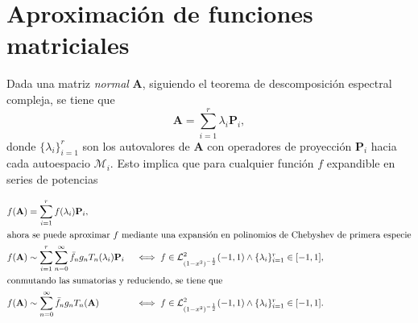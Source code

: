 \section[Aproximación de funciones matriciales]{Aproximación de funciones matriciales}
Dada una matriz \emph{normal} $\mathbf A$, siguiendo el teorema de descomposición espectral compleja, se tiene que 
\begin{equation*}\mathbf A = \sum_{i=1}^r \lambda_i \mathbf P_i, \end{equation*}
donde $\{\lambda_i\}_{i=1}^r$ son los autovalores de $\mathbf A$ con operadores de proyección $\mathbf P_i$ hacia cada autoespacio $\mathcal M_i$. Esto implica que para cualquier función $f$ expandible en series de potencias

\begin{align*} 
	f(\mathbf A) &= \sum_{i=1}^r f(\lambda_i) \mathbf P_i,\\
	\intertext{ahora se puede aproximar $f$ mediante una expansión en polinomios de Chebyshev de primera especie}
	f(\mathbf A) &\sim \sum_{i=1}^r \sum_{n=0}^\infty \bar{f}_n g_n T_n(\lambda_i) \mathbf P_i
	&&\iff f \in \mathcal{L}^2_{(1-x^2)^{-\frac12}} (-1, 1) \land \{\lambda_i\}_{i=1}^r \in [-1, 1],\\
	\intertext{conmutando las sumatorias y reduciendo, se tiene que}
	f(\mathbf A) &\sim \sum_{n=0}^\infty \bar{f}_n g_n T_n(\mathbf A) 
	&&\iff f \in \mathcal{L}^2_{(1-x^2)^{-\frac12}} (-1, 1) \land \{\lambda_i\}_{i=1}^r \in [-1, 1].
\end{align*}